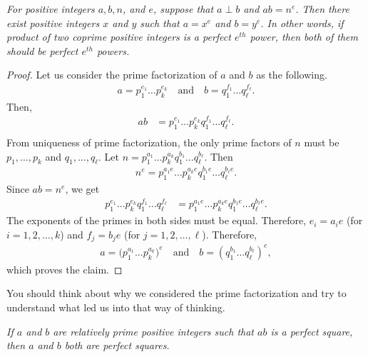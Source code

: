 \documentclass{subfile}
\begin{document}
	\begin{theorem}\slshape
		For positive integers $a, b, n$, and $e$, suppose that $a\perp b$ and $ab=n^e$. Then there exist positive integers $x$ and $y$ such that $a=x^e$ and $b=y^e$. In other  words, if product of two coprime positive integers is a perfect $e^{th}$ power, then both of them should be perfect $e^{th}$ powers. \label{thm:copower}
	\end{theorem}

	\begin{proof}
		Let us consider the prime factorization of $a$ and $b$ as the following.
		\begin{align*}
			a  = p_1^{e_1}\dots p_k^{e_k}\quad \text{and} \quad b = q_1^{f_1}\dots q_\ell^{f_\ell}.
		\end{align*}
		Then,
		\begin{align*}
			ab &= p_1^{e_1}\dots p_k^{e_k}q_1^{f_1}\dots q_\ell^{f_\ell}.\\
		\end{align*}
		From uniqueness of prime factorization, the only prime factors of $n$ must be $p_1,\dots,p_k$ and $q_1,\dots,q_\ell$. Let $n = p_1^{a_1}\dots p_k^{a_k}q_1^{b_1}\dots q_\ell^{b_\ell}$. Then
		\begin{align*}
			n^e  = p_1^{a_1e}\dots p_k^{a_ke}q_1^{b_1e}\dots q_\ell^{b_\ell e}.
		\end{align*}
		Since $ab=n^e$, we get
		\begin{align*}
			p_1^{e_1}\dots p_k^{e_k}q_1^{f_1}\dots q_\ell^{f_\ell} & = p_1^{a_1e}\dots p_k^{a_ke}q_1^{b_1e}\dots q_\ell^{b_\ell e}.
		\end{align*}
		The exponents of the primes in both sides must be equal. Therefore, $e_i=a_ie$ (for $i=1,2,\ldots,k$) and $f_j=b_je$ (for $j=1,2,\ldots,\ell$). Therefore,
		\begin{align*}
			a = \Big(p_1^{a_1}\dots p_k^{a_k}\Big)^e \quad \text{and} \quad b = \left(q_1^{b_1}\dots q_\ell^{b_\ell}\right)^e,
		\end{align*}
		which proves the claim.
	\end{proof}

	\begin{note}
		You should think about why we considered the prime factorization and try to understand what led us into that way of thinking.
	\end{note}

	\begin{corollary}\slshape
		If $a$ and $b$ are relatively prime positive integers such that $ab$ is a perfect square, then $a$ and $b$ both are perfect squares.\label{cor:sqr}
	\end{corollary}
\end{document}
